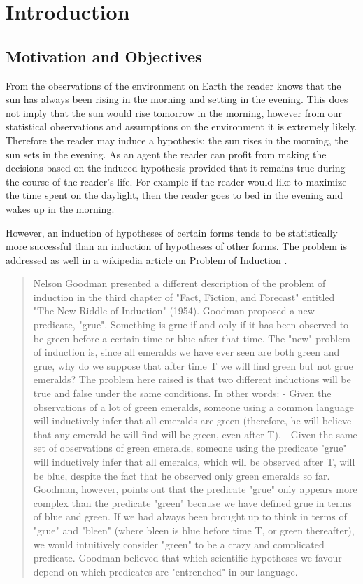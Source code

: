 
\chapter{Introduction}

\section{Motivation and Objectives}
From the observations of the environment on Earth the reader knows that the sun has always been rising in the morning and setting in the evening. This does not imply that the sun would rise tomorrow in the morning, however from our statistical observations and assumptions on the environment it is extremely likely. Therefore the reader may induce a hypothesis: the sun rises in the morning, the sun sets in the evening. As an agent the reader can profit from making the decisions based on the induced hypothesis provided that it remains true during the course of the reader's life. For example if the reader would like to maximize the time spent on the daylight, then the reader goes to bed in the evening and wakes up in the morning.

However, an induction of hypotheses of certain forms tends to be statistically more successful than an induction of hypotheses of other forms. The problem is addressed as well in a wikipedia article on Problem of Induction \cite{wikipediaProblemOfInduction}.

\begin{quote}
Nelson Goodman presented a different description of the problem of induction  in the third chapter of "Fact, Fiction, and Forecast" entitled "The New Riddle of Induction" (1954). Goodman proposed a new predicate, "grue". Something is grue if and only if it has been observed to be green before a certain time or blue after that time. The "new" problem of induction is, since all emeralds we have ever seen are both green and grue, why do we suppose that after time T we will find green but not grue emeralds? The problem here raised is that two different inductions will be true and false under the same conditions. In other words:
- Given the observations of a lot of green emeralds, someone using a common language will inductively infer that all emeralds are green (therefore, he will believe that any emerald he will find will be green, even after T).
- Given the same set of observations of green emeralds, someone using the predicate "grue" will inductively infer that all emeralds, which will be observed after T, will be blue, despite the fact that he observed only green emeralds so far.
Goodman, however, points out that the predicate "grue" only appears more complex than the predicate "green" because we have defined grue in terms of blue and green. If we had always been brought up to think in terms of "grue" and "bleen" (where bleen is blue before time T, or green thereafter), we would intuitively consider "green" to be a crazy and complicated predicate. Goodman believed that which scientific hypotheses we favour depend on which predicates are "entrenched" in our language.
\end{quote}

